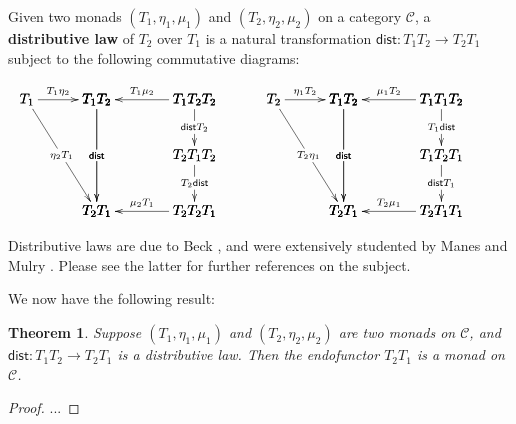 \documentclass{article}
\let\mto\to
\let\to\relax
\newcommand{\to}{\rightarrow}
\newcommand{\cat}[1]{\mathcal{#1}}
\newtheorem{theorem}{Theorem}
\begin{document}
Given two monads $(T_1,\eta_1,\mu_1)$ and $(T_2,\eta_2,\mu_2)$ on a
category $\cat{C}$, a \textbf{distributive law} of $T_2$ over $T_1$ is
a natural transformation $\mathsf{dist} : T_1T_2 \mto T_2T_1$
subject to the following commutative diagrams:
\begin{center}  
  \begin{math}
    \begin{array}{lll}
      \bfig
      \qtriangle|amm|<500,800>[
        T_1`
        T_1T_2`
        T_2T_1;
        T_1\eta_2`
        \eta_2T_1`
        \mathsf{dist}]
      \square(500,0)|amma|/<-`->``<-/<700,800>[
        T_1T_2`
        T_1T_2T_2`
        T_2T_1`
        T_2T_2T_1;
        T_1\mu_2`
        \mathsf{dist}``
        \mu_2T_1]
      \morphism(1200,800)|m|<0,-400>[
        T_1T_2T_2`
        T_2T_1T_2;
        \mathsf{dist}T_2]
      \morphism(1200,400)|m|<0,-400>[
        T_2T_1T_2`
        T_2T_2T_1;
        T_2\mathsf{dist}]
      \efig
      & \quad &
      \bfig
      \qtriangle|amm|<500,800>[
        T_2`
        T_1T_2`
        T_2T_1;
        \eta_1T_2`
        T_2\eta_1`
        \mathsf{dist}]
      \square(500,0)|amma|/<-`->``<-/<700,800>[
        T_1T_2`
        T_1T_1T_2`
        T_2T_1`
        T_2T_1T_1;
        \mu_1T_2`
        \mathsf{dist}``
        T_2\mu_1]
      \morphism(1200,800)|m|<0,-400>[
        T_1T_1T_2`
        T_1T_2T_1;
        T_1\mathsf{dist}]
      \morphism(1200,400)|m|<0,-400>[
        T_1T_2T_1`
        T_2T_1T_1;
        \mathsf{dist}T_1]
      \efig
    \end{array}
  \end{math}
\end{center}
Distributive laws are due to Beck \cite{Beck:1969}, and were
extensively studented by Manes and Mulry \cite{Manes:2007,Manes:2008}.
Please see the latter for further references on the subject.

We now have the following result:
\begin{theorem}
  \label{thm:compose_1}
  Suppose $(T_1,\eta_1,\mu_1)$ and $(T_2,\eta_2,\mu_2)$ are two monads
  on $\cat{C}$, and $\mathsf{dist} : T_1T_2 \mto T_2T_1$ is a
  distributive law.  Then the endofunctor $T_2T_1$ is a monad on
  $\cat{C}$.
\end{theorem}
\begin{proof}
  ...
\end{proof}
\end{document}
